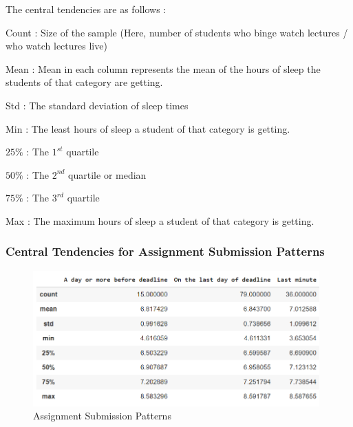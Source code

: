 \documentclass[11pt,]{beamer}
\begin{document}
\begin{frame}

The central tendencies are as follows : 
    
    \begin{block}
    
    Count : Size of the sample (Here, number of students who binge watch lectures / who watch lectures live)
    
    \smallskip
    
    Mean : Mean in each column represents the mean of the hours of sleep the students of that category are getting. 
    
    \smallskip
    
    Std : The standard deviation of sleep times
    
    \smallskip
    
    Min : The least hours of sleep a student of that category is getting.
    
    \smallskip
    
    $25\%$ : The $1^{st}$ quartile
    
    \smallskip
    
    $50\%$ : The $2^{nd}$ quartile or median
    
    \smallskip
    
    $75\%$ : The $3^{rd}$ quartile 
    
    \smallskip
    
    Max : The maximum hours of sleep a student of that category is getting. 
    
    \end{block}
    
\end{frame}

\begin{frame}

    \frametitle{Central Tendencies for Assignment Submission Patterns}
    
    \begin{figure}
		\includegraphics[width=11cm]{DF_Assignments.png}
		\caption{Assignment Submission Patterns}
	\end{figure}
    
\end{frame}
\end{document}
